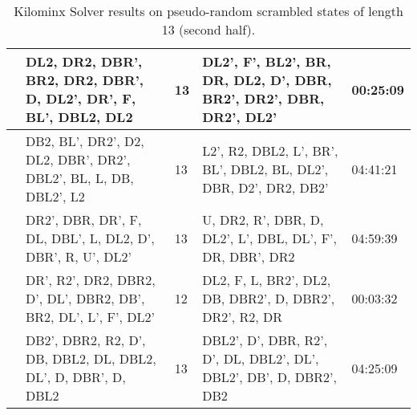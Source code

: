 \begin{table}[h]
{\begin{tabular}{|p{2cm}|p{7cm}|p{2cm}|p{7cm}|p{2.8cm}|}
 & DL2, DR2, DBR', BR2, DR2, DBR',   D, DL2', DR', F, BL', DBL2, DL2 & 13 & DL2', F', BL2', BR, DR, DL2, D',   DBR, BR2', DR2', DBR, DR2', DL2' & 00:25:09 \\ \hline
 & DB2, BL', DR2', D2, DL2, DBR',   DR2', DBL2', BL, L, DB, DBL2', L2 & 13 & L2', R2, DBL2, L', BR', BL',   DBL2, BL, DL2', DBR, D2', DR2, DB2' & 04:41:21 \\ \hline
 & DR2', DBR, DR', F, DL, DBL', L,   DL2, D', DBR', R, U', DL2' & 13 & U, DR2, R', DBR, D, DL2', L',   DBL, DL', F', DR, DBR', DR2 & 04:59:39 \\ \hline
 & \cellcolor[HTML]{E2EFD9}DR', R2', DR2, DBR2, D', DL',   DBR2, DB', BR2, DL', L', F', DL2' & \cellcolor[HTML]{E2EFD9}12 & \cellcolor[HTML]{E2EFD9}DL2, F, L, BR2', DL2, DB, DBR2',   D, DBR2', DR2', R2, DR & \cellcolor[HTML]{E2EFD9}00:03:32 \\ \hline
 & DB2', DBR2, R2, D', DB, DBL2,   DL, DBL2, DL', D, DBR', D, DBL2 & 13 & DBL2', D', DBR, R2', D', DL,   DBL2', DL', DBL2', DB', D, DBR2', DB2 & 04:25:09 \\ \hline
\end{tabular}%
}
\centering
\caption{Kilominx Solver results on pseudo-random scrambled states of length 13 (second half).}
\label{tab:results-3}
\end{table}

\begin{table}[h]
\centering
{}
\centering
\caption{Kilominx Solver results on pseudo-random scrambled states of length 14.}
\label{tab:results-4}
\end{table}